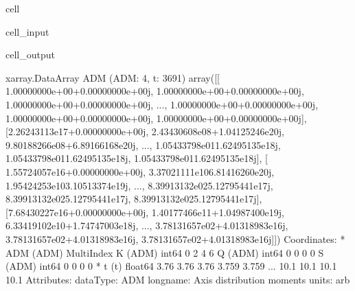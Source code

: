 \documentclass[letterpaper,table,10pt,english]{jupyterBook}
\begin{document}
\begin{sphinxuseclass}{cell}
\begin{sphinxVerbatimInput}
\begin{sphinxuseclass}{cell_input}
\end{sphinxuseclass}\end{sphinxVerbatimInput}
\begin{sphinxVerbatimOutput}

\begin{sphinxuseclass}{cell_output}
\begin{sphinxVerbatim}[commandchars=\\\{\}]
\PYGZlt{}xarray.DataArray \PYGZsq{}ADM\PYGZsq{} (ADM: 4, t: 3691)\PYGZgt{}
array([[ 1.00000000e+00+0.00000000e+00j,  1.00000000e+00+0.00000000e+00j,
         1.00000000e+00+0.00000000e+00j, ...,
         1.00000000e+00+0.00000000e+00j,  1.00000000e+00+0.00000000e+00j,
         1.00000000e+00+0.00000000e+00j],
       [\PYGZhy{}2.26243113e\PYGZhy{}17+0.00000000e+00j,  2.43430608e\PYGZhy{}08+1.04125246e\PYGZhy{}20j,
         9.80188266e\PYGZhy{}08+6.89166168e\PYGZhy{}20j, ...,
         1.05433798e\PYGZhy{}01\PYGZhy{}1.62495135e\PYGZhy{}18j,  1.05433798e\PYGZhy{}01\PYGZhy{}1.62495135e\PYGZhy{}18j,
         1.05433798e\PYGZhy{}01\PYGZhy{}1.62495135e\PYGZhy{}18j],
       [ 1.55724057e\PYGZhy{}16+0.00000000e+00j, \PYGZhy{}3.37021111e\PYGZhy{}10\PYGZhy{}6.81416260e\PYGZhy{}20j,
         1.95424253e\PYGZhy{}10\PYGZhy{}3.10513374e\PYGZhy{}19j, ...,
         8.39913132e\PYGZhy{}02\PYGZhy{}5.12795441e\PYGZhy{}17j,  8.39913132e\PYGZhy{}02\PYGZhy{}5.12795441e\PYGZhy{}17j,
         8.39913132e\PYGZhy{}02\PYGZhy{}5.12795441e\PYGZhy{}17j],
       [\PYGZhy{}7.68430227e\PYGZhy{}16+0.00000000e+00j, \PYGZhy{}1.40177466e\PYGZhy{}11+1.04987400e\PYGZhy{}19j,
         6.33419102e\PYGZhy{}10+1.74747003e\PYGZhy{}18j, ...,
         3.78131657e\PYGZhy{}02+4.01318983e\PYGZhy{}16j,  3.78131657e\PYGZhy{}02+4.01318983e\PYGZhy{}16j,
         3.78131657e\PYGZhy{}02+4.01318983e\PYGZhy{}16j]])
Coordinates:
  * ADM      (ADM) MultiIndex
  \PYGZhy{} K        (ADM) int64 0 2 4 6
  \PYGZhy{} Q        (ADM) int64 0 0 0 0
  \PYGZhy{} S        (ADM) int64 0 0 0 0
  * t        (t) float64 \PYGZhy{}3.76 \PYGZhy{}3.76 \PYGZhy{}3.76 \PYGZhy{}3.759 \PYGZhy{}3.759 ... 10.1 10.1 10.1 10.1
Attributes:
    dataType:   ADM
    long\PYGZus{}name:  Axis distribution moments
    units:      arb
\end{sphinxVerbatim}

\end{sphinxuseclass}\end{sphinxVerbatimOutput}

\end{sphinxuseclass}
\end{document}

